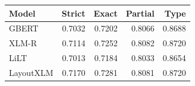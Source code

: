\begin{tabular}{@{}lrrrr@{}}
\toprule
Model & Strict & Exact & Partial & Type \\
\midrule
GBERT & 0.7032 & 0.7202 & 0.8066 & 0.8688 \\
XLM-R & 0.7114 & 0.7252 & 0.8082 & 0.8720 \\
LiLT & 0.7013 & 0.7184 & 0.8033 & 0.8654 \\
LayoutXLM & 0.7170 & 0.7281 & 0.8081 & 0.8720 \\
\bottomrule
\end{tabular}
